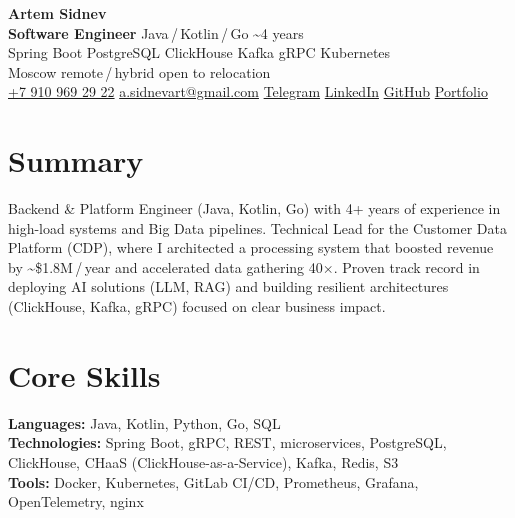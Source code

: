 \documentclass[10pt,a4paper]{article}
\newcommand{\contactsep}{\enspace\textbar\enspace}
\begin{document}
\fontsize{9.8pt}{11.4pt}\selectfont

\begin{center}
{\LARGE \textbf{Artem Sidnev}}\\[0.05em]
{\normalsize \textbf{Software Engineer} \textbullet{} Java\,/\,Kotlin\,/\,Go \textbullet{} \textasciitilde4 years}\\[0.12em]
{\footnotesize Spring Boot \textbullet{} PostgreSQL \textbullet{} ClickHouse \textbullet{} Kafka \textbullet{} gRPC \textbullet{} Kubernetes}\\[0.13em]
{\footnotesize Moscow \textbullet{} remote\,/\,hybrid \textbullet{} open to relocation}\\[0.13em]
{\footnotesize
\href{tel:+79109692922}{+7 910 969 29 22}
\contactsep \href{mailto:a.sidnevart@gmail.com}{a.sidnevart@gmail.com}
\contactsep \href{https://t.me/sidnevart}{Telegram}
\contactsep \href{https://www.linkedin.com/in/artem-sidnev-b109ab401/}{LinkedIn}
\contactsep \href{https://github.com/sidnevart}{GitHub}
\contactsep \href{https://sidnevart.github.io/personal-web-page/}{Portfolio}
}
\end{center}

\vspace{-0.14em}

\section*{Summary}
Backend \& Platform Engineer (Java, Kotlin, Go) with 4+ years of experience in high-load systems and Big Data pipelines. Technical Lead for the Customer Data Platform (CDP), where I architected a processing system that boosted revenue by \textasciitilde\$1.8M\,/\,year and accelerated data gathering 40$\times$. Proven track record in deploying AI solutions (LLM, RAG) and building resilient architectures (ClickHouse, Kafka, gRPC) focused on clear business impact.

\section*{Core Skills}
\textbf{Languages:} Java, Kotlin, Python, Go, SQL \\
\textbf{Technologies:} Spring Boot, gRPC, REST, microservices, PostgreSQL, ClickHouse, CHaaS (ClickHouse-as-a-Service), Kafka, Redis, S3 \\
\textbf{Tools:} Docker, Kubernetes, GitLab CI/CD, Prometheus, Grafana, OpenTelemetry, nginx
\end{document}
